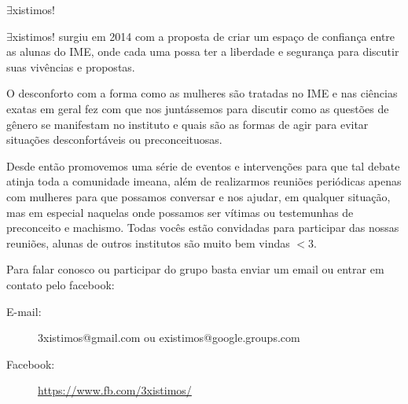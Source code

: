 \begin{subsecao}{$\exists$xistimos!}



$\exists$xistimos! surgiu em 2014 com a proposta de criar um espaço de
confiança entre as alunas do IME, onde cada uma possa ter a liberdade e
segurança para discutir suas vivências e propostas.

O desconforto com a forma como as mulheres são tratadas no IME e nas ciências
exatas em geral fez com que nos juntássemos para discutir como as questões de
gênero se manifestam no instituto e quais são as formas de agir para evitar
situações desconfortáveis ou preconceituosas.

Desde então promovemos uma série de eventos e intervenções para que tal debate
atinja toda a comunidade imeana, além de realizarmos reuniões periódicas apenas
com mulheres para que possamos conversar e nos ajudar, em qualquer situação,
mas em especial naquelas onde possamos ser vítimas ou testemunhas de  
preconceito e machismo. Todas vocês estão convidadas para participar das nossas  
reuniões, alunas de outros institutos são muito bem vindas $<$3.

Para falar conosco ou participar do grupo basta enviar um email ou entrar em
contato pelo facebook:


\begin{description}

\item[E-mail:] 3xistimos@gmail.com ou existimos@google.groups.com
\item[Facebook:] \url{https://www.fb.com/3xistimos/}

\end{description}


\end{subsecao}


